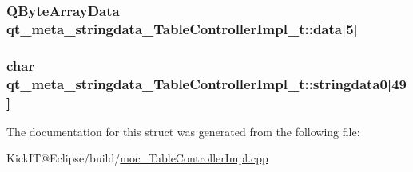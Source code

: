 \subsubsection[{\texorpdfstring{data}{data}}]{\setlength{\rightskip}{0pt plus 5cm}Q\+Byte\+Array\+Data qt\+\_\+meta\+\_\+stringdata\+\_\+\+Table\+Controller\+Impl\+\_\+t\+::data\mbox{[}5\mbox{]}}\hypertarget{structqt__meta__stringdata___table_controller_impl__t_abf949a0469f361c0c90653150fc8d0b3}{}\label{structqt__meta__stringdata___table_controller_impl__t_abf949a0469f361c0c90653150fc8d0b3}
\subsubsection[{\texorpdfstring{stringdata0}{stringdata0}}]{\setlength{\rightskip}{0pt plus 5cm}char qt\+\_\+meta\+\_\+stringdata\+\_\+\+Table\+Controller\+Impl\+\_\+t\+::stringdata0\mbox{[}49\mbox{]}}\hypertarget{structqt__meta__stringdata___table_controller_impl__t_ad671611e780842223ffc0eb77564b446}{}\label{structqt__meta__stringdata___table_controller_impl__t_ad671611e780842223ffc0eb77564b446}


The documentation for this struct was generated from the following file\+:\begin{DoxyCompactItemize}
\item 
Kick\+I\+T@\+Eclipse/build/\hyperlink{moc___table_controller_impl_8cpp}{moc\+\_\+\+Table\+Controller\+Impl.\+cpp}\end{DoxyCompactItemize}
